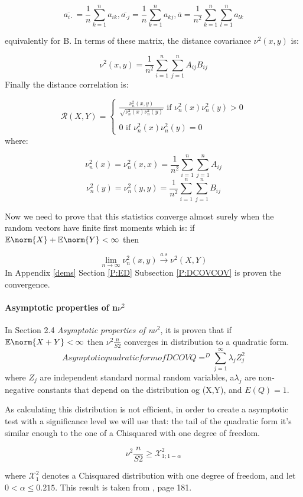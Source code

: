$$\overline{a_{i\cdot}} = \frac{1}{n}\sum_{k=1}^{n}a_{ik},\overline{a_{\cdot j}} = \frac{1}{n}\sum_{k=1}^{n}a_{kj}, \overline{a} =  \frac{1}{n^{2}}\sum_{k=1}^{n}\sum_{l=1}^{n}a_{lk}$$

equivalently for B. In terms of these matrix, the distance covariance $\nu^{2}(x,y)$ is:

$$\nu^{2}(x,y) = \frac{1}{n^{2}}\sum_{i=1}^{n}\sum_{j=1}^{n}A_{ij}B_{ij}$$
Finally the distance correlation is:

$$
\mathcal{R}(X,Y) = \left \{
	\begin{array}{c} 
		\frac{\nu^{2}_{n}(x,y)}{\sqrt{\nu^{2}_{n}(x)\nu^{2}_{n}(y)}} \text{ if } \nu^{2}_{n}(x)\nu^{2}_{n}(y) > 0 \\ 
		\\
		0 \text{ if } \nu^{2}_{n}(x)\nu^{2}_{n}(y) = 0 
	\end{array}
	\right.  
$$
where: 

$$
\nu^{2}_{n}(x) = \nu^{2}_{n}(x,x) = \frac{1}{n^{2}}\sum_{i=1}^{n}\sum_{j=1}^{n}A_{ij}
$$
$$
\nu^{2}_{n}(y) = \nu^{2}_{n}(y,y) = \frac{1}{n^{2}}\sum_{i=1}^{n}\sum_{j=1}^{n}B_{ij}
$$

Now we need to prove that this statistics converge almost surely when the random vectors have finite first moments which is: 
if $\mathbb{E}\norm{X} + \mathbb{E}\norm{Y} < \infty$ then

$$
\lim_{n\to\infty} \nu^{2}_{n}(x,y) \xrightarrow{a.s} \nu^{2}(X,Y)
$$
In Appendix \ref{dems} Section \ref{P:ED} Subsection \ref{P:DCOVCOV} is proven the convergence.

\paragraph{Asymptotic properties of n$\nu^{2}$}

In \cite{DCOV_1} Section 2.4 \textit{Asymptotic properties of n$\nu^{2}$}, it is proven that if $\mathbb{E}\norm{X+Y}< \infty$ then $\nu^{2}\frac{n}{S2}$ converges in distribution to a quadratic form.
\begin{equation}{Asymptotic quadratic form of DCOV}
Q =^{D}\sum_{j=1}^{\infty} \lambda_{j}Z_{j}^{2}
\end{equation}
where $Z_{j}$ are independent standard normal random variables, a$\lambda_{j}$ are non-negative constants that depend on the distribution og (X,Y), and $E(Q)=1$.

As calculating this distribution is not efficient, in order to create a asymptotic test with a significance level we will use that: the tail of the quadratic form it's similar enough to the one of a Chisquared with one degree of freedom.

$$
\nu^{2}\frac{n}{S2} \geq \mathcal{X}_{1;1-\alpha}^{2}
$$ 

where $\mathcal{X}_{1}^{2}$ denotes a Chisquared distribution with one degree of freedom, and let $0<\alpha\leq0.215$. This result is taken from \cite{DCOV_Chisq}, page 181.





